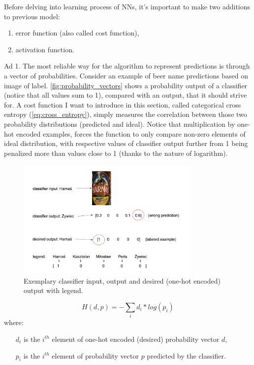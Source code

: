 \documentclass[11pt]{article}
\begin{document}
Before delving into learning process of NNs, it's important to make two additions to previous model:
\begin{enumerate}[1)]
\item error function (also called cost function),
\item activation function.
\end{enumerate}
Ad 1. The most reliable way for the algorithm to represent predictions is through a vector of probabilities. Consider an example of beer name predictions based on image of label. \autoref{fig:probability_vectors} shows a probability output of a classifier (notice that all values sum to 1), compared with an output, that it should strive for. A cost function I want to introduce in this section, called categorical cross entropy (\autoref{eq:cross_entropy}), simply measures the correlation between those two probability distributions (predicted and ideal). Notice that multiplication by one-hot encoded examples, forces the function to only compare non-zero elements of ideal distribution, with respective values of classifier output further from 1 being penalized more than values close to 1 (thanks to the nature of logarithm).\\ 

\begin{figure}[h]
\includegraphics[width=0.8\textwidth]{probability_vectors}
\centering
\caption{Exemplary classifier input, output and desired (one-hot encoded) output with legend.}
\label{fig:probability_vectors}
\end{figure}

\begin{equation} \label{eq:cross_entropy}
H(d, p) = -\sum_i d_i * log(p_i)
\end{equation}
where:
\begin{itemize}
\item[$d_i$] is the $i^{th}$ element of one-hot encoded (desired) probability vector $d$,
\item[$p_i$] is the $i^{th}$ element of probability vector $p$ predicted by the classifier.
\end{itemize}
\end{document}
